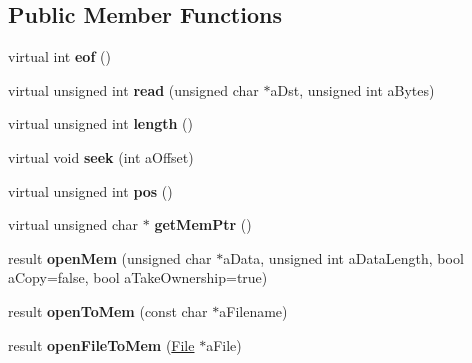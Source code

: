 \subsection*{Public Member Functions}
\begin{DoxyCompactItemize}
\item 
\mbox{\label{class_so_loud_1_1_memory_file_acfe99485f35ab6c86ee803a7d8264ac5}} 
virtual int {\bfseries eof} ()
\item 
\mbox{\label{class_so_loud_1_1_memory_file_ad536746b8182f14f5201e56a35c23d69}} 
virtual unsigned int {\bfseries read} (unsigned char $\ast$a\+Dst, unsigned int a\+Bytes)
\item 
\mbox{\label{class_so_loud_1_1_memory_file_a6008eda4f47eb0d9d1f62ffb48b42f36}} 
virtual unsigned int {\bfseries length} ()
\item 
\mbox{\label{class_so_loud_1_1_memory_file_a9f381c66f4803d69fabc9a88dd89c51e}} 
virtual void {\bfseries seek} (int a\+Offset)
\item 
\mbox{\label{class_so_loud_1_1_memory_file_ac698163e644dddb838ea01152c1583a3}} 
virtual unsigned int {\bfseries pos} ()
\item 
\mbox{\label{class_so_loud_1_1_memory_file_adce1b3d03cd39ed2fd6ac55c016816c4}} 
virtual unsigned char $\ast$ {\bfseries get\+Mem\+Ptr} ()
\item 
\mbox{\label{class_so_loud_1_1_memory_file_ae7cb1c1a67e3b7c823f476b020c13d65}} 
result {\bfseries open\+Mem} (unsigned char $\ast$a\+Data, unsigned int a\+Data\+Length, bool a\+Copy=false, bool a\+Take\+Ownership=true)
\item 
\mbox{\label{class_so_loud_1_1_memory_file_ad5f92cd7d93255151b817169ec9ab9b6}} 
result {\bfseries open\+To\+Mem} (const char $\ast$a\+Filename)
\item 
\mbox{\label{class_so_loud_1_1_memory_file_a7cb55217fc03da894d3463f7577f45dd}} 
result {\bfseries open\+File\+To\+Mem} (\mbox{\hyperlink{class_so_loud_1_1_file}{File}} $\ast$a\+File)
\end{DoxyCompactItemize}
